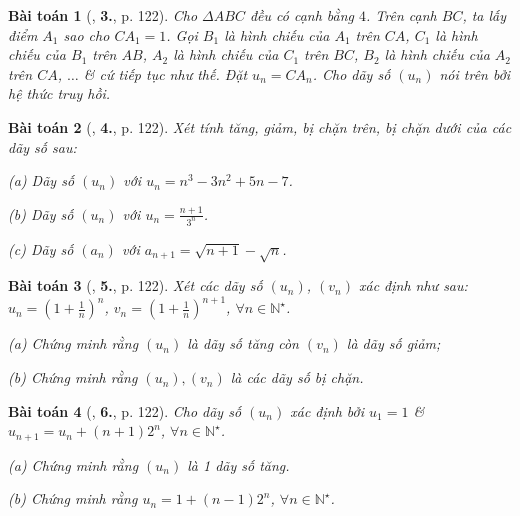 \documentclass{article}
\numberwithin{equation}{section}
\newtheorem{baitoan}{Bài toán}[section]
\begin{document}
\begin{baitoan}[\cite{TL_chuyen_Toan_Dai_So_Giai_Tich_11}, \textbf{3.}, p. 122]
	Cho $\Delta ABC$ đều có cạnh bằng $4$. Trên cạnh $BC$, ta lấy điểm $A_1$ sao cho $CA_1 = 1$. Gọi $B_1$ là hình chiếu của $A_1$ trên $CA$, $C_1$ là hình chiếu của $B_1$ trên $AB$, $A_2$ là hình chiếu của $C_1$ trên $BC$, $B_2$ là hình chiếu của $A_2$ trên $CA$, $\ldots$ \& cứ tiếp tục như thế. Đặt $u_n = CA_n$. Cho dãy số $(u_n)$ nói trên bởi hệ thức truy hồi.
\end{baitoan}

\begin{baitoan}[\cite{TL_chuyen_Toan_Dai_So_Giai_Tich_11}, \textbf{4.}, p. 122]
	Xét tính tăng, giảm, bị chặn trên, bị chặn dưới của các dãy số sau:
	\begin{enumerate*}
		\item[(a)] Dãy số $(u_n)$ với $u_n = n^3 - 3n^2 + 5n - 7$.
		\item[(b)] Dãy số $(u_n)$ với $u_n = \frac{n + 1}{3^n}$.
		\item[(c)] Dãy số $(a_n)$ với $a_{n+1} = \sqrt{n + 1} - \sqrt{n}$.
	\end{enumerate*}
\end{baitoan}

\begin{baitoan}[\cite{TL_chuyen_Toan_Dai_So_Giai_Tich_11}, \textbf{5.}, p. 122]
	Xét các dãy số $(u_n)$, $(v_n)$ xác định như sau: $u_n = \left(1 + \frac{1}{n}\right)^n$, $v_n = \left(1 + \frac{1}{n}\right)^{n+1}$, $\forall n\in\mathbb{N}^\star$.
	\begin{enumerate*}
		\item[(a)] Chứng minh rằng $(u_n)$ là dãy số tăng còn $(v_n)$ là dãy số giảm;
		\item[(b)] Chứng minh rằng $(u_n),(v_n)$ là các dãy số bị chặn.
	\end{enumerate*}
\end{baitoan}

\begin{baitoan}[\cite{TL_chuyen_Toan_Dai_So_Giai_Tich_11}, \textbf{6.}, p. 122]
	Cho dãy số $(u_n)$ xác định bởi $u_1 = 1$ \& $u_{n+1} = u_n + (n + 1)2^n$, $\forall n\in\mathbb{N}^\star$.
	\begin{enumerate*}
		\item[(a)] Chứng minh rằng $(u_n)$ là 1 dãy số tăng.
		\item[(b)] Chứng minh rằng $u_n = 1 + (n - 1)2^n$, $\forall n\in\mathbb{N}^\star$.
	\end{enumerate*}
\end{baitoan}
\end{document}
